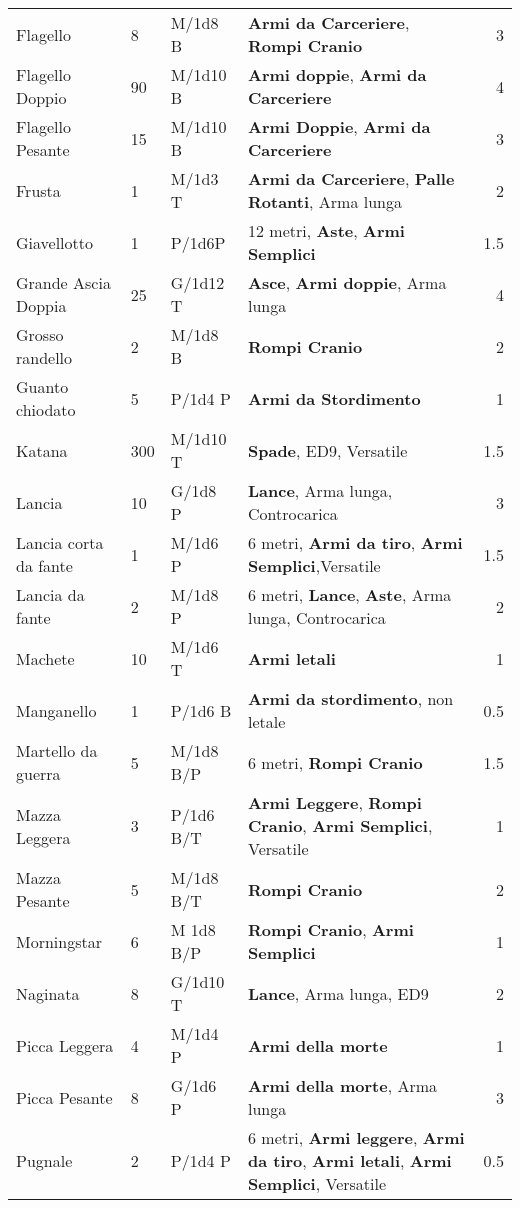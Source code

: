 \documentclass[a4paper,12 pt,openany]{book}
\begin{document}
\begin{textblock*}{19cm}
\begin{xltabular}{1\textwidth}{lllXr}
			Flagello& 8& M/1d8 B& \textbf{Armi da Carceriere}, \textbf{Rompi Cranio}& 3\\
			Flagello Doppio& 90 & M/1d10 B& \textbf{Armi doppie}, \textbf{Armi da Carceriere}& 4\\
			Flagello Pesante& 15 & M/1d10 B& \textbf{Armi Doppie}, \textbf{Armi da Carceriere}& 3\\
			Frusta& 1& M/1d3 T& \textbf{Armi da Carceriere}, \textbf{Palle Rotanti}, Arma lunga& 2\\
			Giavellotto& 1& P/1d6P& 12 metri, \textbf{Aste}, \textbf{Armi Semplici}& 1.5\\
			Grande Ascia Doppia& 25 & G/1d12 T& \textbf{Asce}, \textbf{Armi doppie}, Arma lunga& 4\\
			Grosso randello& 2& M/1d8 B&\textbf{Rompi Cranio}& 2\\
			Guanto chiodato& 5& P/1d4 P&\textbf{Armi da Stordimento}& 1\\
			Katana& 300& M/1d10 T& \textbf{Spade}, ED9, Versatile& 1.5\\
			Lancia& 10 & G/1d8 P&\textbf{Lance}, Arma lunga, Controcarica& 3\\
			Lancia corta da fante& 1& M/1d6 P& 6 metri, \textbf{Armi da tiro},\textbf{ Armi Semplici},Versatile & 1.5\\
			Lancia da fante& 2& M/1d8 P&6 metri, \textbf{Lance}, \textbf{Aste}, Arma lunga, Controcarica& 2 \\
			Machete& 10 & M/1d6 T&\textbf{Armi letali} & 1\\
			Manganello& 1& P/1d6 B& \textbf{Armi da stordimento}, non letale& 0.5\\
			Martello da guerra& 5& M/1d8 B/P& 6 metri, \textbf{Rompi Cranio}& 1.5\\
			Mazza Leggera& 3& P/1d6 B/T& \textbf{Armi Leggere}, \textbf{Rompi Cranio}, \textbf{Armi Semplici}, Versatile&1\\
			Mazza Pesante& 5& M/1d8 B/T& \textbf{Rompi Cranio}& 2\\
			Morningstar& 6& M 1d8 B/P&\textbf{Rompi Cranio},\textbf{ Armi Semplici}& 1\\
			Naginata& 8& G/1d10 T&\textbf{Lance}, Arma lunga, ED9& 2\\
			Picca Leggera& 4& M/1d4 P&\textbf{Armi della morte}& 1\\
			Picca Pesante& 8& G/1d6 P&\textbf{Armi della morte}, Arma lunga& 3\\
			Pugnale& 2& P/1d4 P& 6 metri, \textbf{Armi leggere}, \textbf{Armi da tiro}, \textbf{Armi letali}, \textbf{Armi Semplici}, Versatile& 0.5\\

\end{xltabular}
\end{textblock*}
\end{document}

